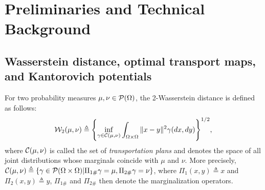 
\section{Preliminaries and Technical Background}
\label{sec:techbg}




\subsection{Wasserstein distance, optimal transport maps, and Kantorovich potentials}


For two probability measures $\mu,\nu \in {\cal P}(\Omega)$, the 2-Wasserstein distance is defined as follows:
\begin{align}
{\cal W}_2(\mu,\nu) \triangleq \Biggl\{ \inf_{\gamma \in {\cal C}(\mu,\nu)} \int_{\Omega \times \Omega} \|x-y\|^2 \gamma(dx , dy) \Biggr\}^{1/2}, \label{eqn:w2}
\end{align}
where ${\cal C}(\mu,\nu)$ is called the set of \emph{transportation plans} and denotes the space of all joint distributions whose marginals coincide with $\mu$ and $\nu$. More precisely, ${\cal C}(\mu,\nu) \triangleq \{\gamma \in {\cal P}(\Omega \times \Omega) | \Pi_{1\#}\gamma = \mu, \Pi_{2\#}\gamma = \nu  \}$, where $\Pi_1(x,y) \triangleq x$ and $\Pi_2(x,y) \triangleq y$, $\Pi_{1\#}$ and $\Pi_{2\#}$ then denote the marginalization operators. 


